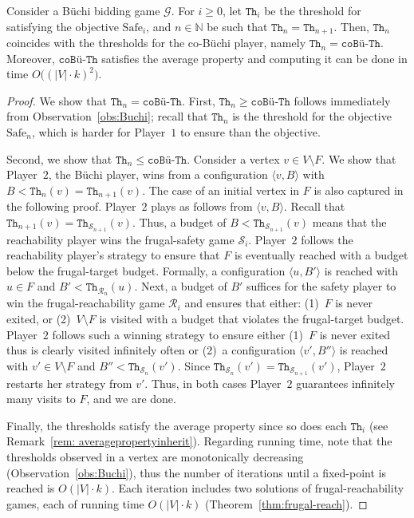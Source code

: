 \documentclass{theoretics}
\newcommand{\PO}{Player~$1$\xspace}
\newcommand{\PT}{Player~$2$\xspace}
\newcommand{\G}{{\mathcal G}}
\newcommand{\R}{{\mathcal R}}
\renewcommand{\S}{{\mathcal S}}
\newcommand{\Nat}{\mathbb{N}}
\newcommand{\notF}{V \setminus F}
\newcommand{\thresh}{\texttt{Th}\xspace}
\newcommand{\coTh}{\texttt{coB\"u-Th}}
\newcommand{\safe}{\text{Safe}}
\newcommand{\coBuchi}{\text{co-B\"uchi}\xspace}
\newcommand{\zug}[1]{\langle #1  \rangle}
\begin{document}
\begin{theorem}
\label{thm:correctness-Buchi}
Consider a B\"uchi bidding game $\G$. For $i \geq 0$, let $\thresh_i$ be the threshold for satisfying the objective $\safe_i$, and $n \in \Nat$ be such that $\thresh_n = \thresh_{n+1}$. Then, $\thresh_n$ coincides with the thresholds for the co-B\"uchi player, namely $\thresh_n = \coTh$. Moreover, $\coTh$ satisfies the average property and computing it can be done in time $O\big((|V| \cdot k)^2\big)$.
\end{theorem}
\begin{proof}
We show that $\thresh_n = \coTh$. First, $\thresh_n \geq \coTh$ follows immediately from Observation~\ref{obs:Buchi}; recall that $\thresh_n$ is the threshold for the objective $\safe_n$,  which is harder for \PO to ensure than the \coBuchi objective. 

Second, we show that $\thresh_n \leq \coTh$. 
Consider a vertex $v \in \notF$. We show that \PT, the B\"uchi player, wins from a configuration $\zug{v, B}$ with $B < \thresh_n(v) = \thresh_{n+1}(v)$. The case of an initial vertex in $F$ is also captured in the following proof. \PT plays as follows from $\zug{v, B}$. Recall that $\thresh_{n+1}(v) = \thresh_{\S_{n+1}}(v)$. Thus, a budget of $B < \thresh_{\S_{n+1}}(v)$ means that the reachability player wins the frugal-safety game $\S_i$. \PT follows the reachability player's strategy to ensure that $F$ is eventually reached with a budget below the frugal-target budget. Formally, a configuration $\zug{u, B'}$ is reached with $u \in F$ and $B' < \thresh_{\R_{n}}(u)$. Next, a budget of $B'$ suffices for the safety player to win the frugal-reachability game $\R_i$ and ensures that either: (1)~$F$ is never exited, or (2)~$\notF$ is visited with a budget that violates the frugal-target budget. \PT follows such a winning strategy to ensure either (1)~$F$ is never exited thus is clearly visited infinitely often or (2)~a configuration $\zug{v', B''}$ is reached with $v' \in \notF$ and $B'' < \thresh_{\S_{n}}(v')$. Since $\thresh_{\S_{n}}(v') = \thresh_{\S_{n+1}}(v')$, \PT restarts her strategy from $v'$. Thus, in both cases \PT guarantees infinitely many visits to $F$, and we are done. 

Finally, the thresholds satisfy the average property since so does each \(\thresh_i\) (see Remark~\ref{rem: averagepropertyinherit}). 
Regarding running time, note that the thresholds observed in a vertex are monotonically decreasing (Observation~\ref{obs:Buchi}), thus the number of iterations until a fixed-point is reached is $O(|V| \cdot k)$. Each iteration includes two solutions of frugal-reachability games, each of running time $O(|V| \cdot k)$ (Theorem~\ref{thm:frugal-reach}). 
\end{proof}
\end{document}
